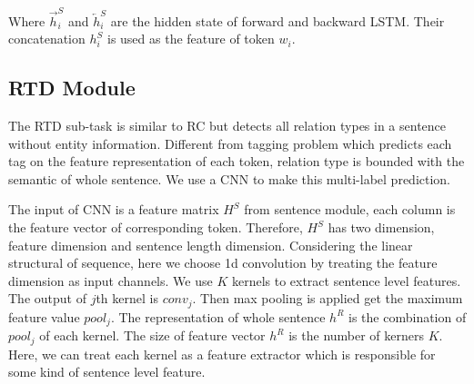 Where $\overrightarrow{h}_i^S$ and $\overleftarrow{h}_i^S$ are the hidden state
of forward and backward LSTM. Their concatenation $h_i^S$ is used as the feature
of token $w_i$.


%
%
%
%
%
%
%

\subsection{RTD Module}
The RTD sub-task is similar to RC but detects all relation types in a sentence
without entity information. Different from tagging problem which predicts each
tag on the feature representation of each token, relation type is bounded with
the semantic of whole sentence. We use a CNN to make this multi-label
prediction.

The input of CNN is a feature matrix $H^S$ from sentence module, each column is
the feature vector of corresponding token. Therefore, $H^S$ has two dimension, feature
dimension and sentence length dimension. Considering the linear structural of
sequence, here we choose 1d convolution by treating the feature dimension as
input channels. We
use $K$ kernels to extract sentence level features. The output of $j$th kernel
is $conv_j$. Then max pooling is applied  get the maximum feature value
$pool_j$. The representation of whole sentence $h^R$ is the combination of
$pool_j$ of each kernel. The size of feature vector $h^R$ is the number of
kerners $K$. Here, we can treat each kernel as a feature extractor which is
responsible for some kind of sentence level feature.

